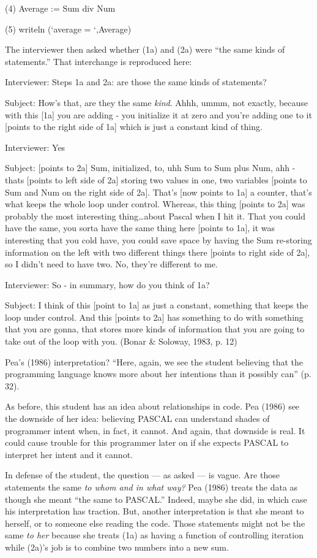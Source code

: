 (4) Average := Sum div Num

(5) writeln (`average = `,Average)

The interviewer then asked whether (1a) and (2a) were ``the same kinds
of statements.'' That interchange is reproduced here:

Interviewer: Steps 1a and 2a: are those the same kinds of statements?

Subject: How's that, are they the same \emph{kind}. Ahhh, ummm, not
exactly, because with this {[}1a{]} you are adding - you initialize it
at zero and you're adding one to it {[}points to the right side of 1a{]}
which is just a constant kind of thing.

Interviewer: Yes

Subject: {[}points to 2a{]} Sum, initialized, to, uhh Sum to Sum plus
Num, ahh - thats {[}points to left side of 2a{]} storing two values in
one, two variables {[}points to Sum and Num on the right side of 2a{]}.
That's {[}now points to 1a{]} a counter, that's what keeps the whole
loop under control. Whereas, this thing {[}points to 2a{]} was probably
the most interesting thing\ldots{}about Pascal when I hit it. That you
could have the same, you sorta have the same thing here {[}points to
1a{]}, it was interesting that you cold have, you could save space by
having the Sum re-storing information on the left with two different
things there {[}points to right side of 2a{]}, so I didn't need to have
two. No, they're different to me.

Interviewer: So - in summary, how do you think of 1a?

Subject: I think of this {[}point to 1a{]} as just a constant, something
that keeps the loop under control. And this {[}points to 2a{]} has
something to do with something that you are gonna, that stores more
kinds of information that you are going to take out of the loop with
you. (Bonar \& Soloway, 1983, p. 12)

Pea's (1986) interpretation? ``Here, again, we see the student believing
that the programming language knows more about her intentions than it
possibly can'' (p. 32).

As before, this student has an idea about relationships in code. Pea
(1986) see the downside of her idea: believing PASCAL can understand
shades of programmer intent when, in fact, it cannot. And again, that
downside is real. It could cause trouble for this programmer later on if
she expects PASCAL to interpret her intent and it cannot.

In defense of the student, the question --- as asked --- is vague. Are
those statements the same \emph{to whom and in what way?} Pea (1986)
treats the data as though she meant ``the same to PASCAL.'' Indeed,
maybe she did, in which case his interpretation has traction. But,
another interpretation is that she meant to herself, or to someone else
reading the code. Those statements might not be the same \emph{to her}
because she treats (1a) as having a function of controlling iteration
while (2a)'s job is to combine two numbers into a new sum.

